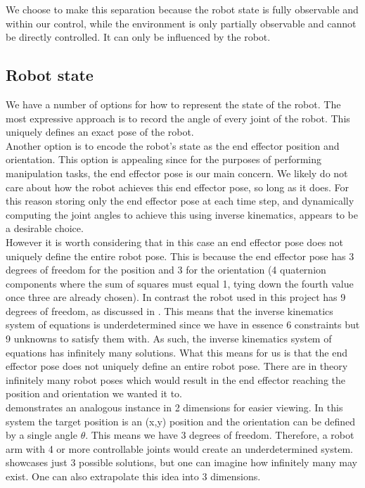 We choose to make this separation because the robot state is fully observable and within our control, while the environment is only partially observable and cannot be directly controlled. It can only be influenced by the robot.

\subsection{Robot state}
We have a number of options for how to represent the state of the robot. The most expressive approach is to record the angle of every joint of the robot. This uniquely defines an exact pose of the robot.\\

Another option is to encode the robot's state as the end effector position and orientation. This option is appealing since for the purposes of performing manipulation tasks, the end effector pose is our main concern. We likely do not care about how the robot achieves this end effector pose, so long as it does. For this reason storing only the end effector pose at each time step, and dynamically computing the joint angles to achieve this using inverse kinematics, appears to be a desirable choice.\\

However it is worth considering that in this case an end effector pose does not uniquely define the entire robot pose. This is because the end effector pose has 3 degrees of freedom for the position and 3 for the orientation (4 quaternion components where the sum of squares must equal 1, tying down the fourth value once three are already chosen). In contrast the robot used in this project has 9 degrees of freedom, as discussed in . This means that the inverse kinematics system of equations is underdetermined since we have in essence 6 constraints but 9 unknowns to satisfy them with. As such, the inverse kinematics system of equations has infinitely many solutions. What this means for us is that the end effector pose does not uniquely define an entire robot pose. There are in theory infinitely many robot poses which would result in the end effector reaching the position and orientation we wanted it to.\\

 demonstrates an analogous instance in 2 dimensions for easier viewing. In this system the target position is an (x,y) position and the orientation can be defined by a single angle $\theta$. This means we have 3 degrees of freedom. Therefore, a robot arm with 4 or more controllable joints would create an underdetermined system.  showcases just 3 possible solutions, but one can imagine how infinitely many may exist. One can also extrapolate this idea into 3 dimensions.

